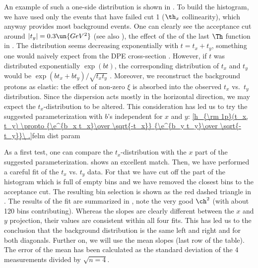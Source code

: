 \bmfig
{}
\emfig

An example of such a one-side distribution is shown in . To build the histogram, we have used only the events that have failed cut 1 ($\th_x$ collinearity), which anyway provides most background events. One can clearly see the acceptance cut around $|t_y| = 0.3\un{GeV^2}$ (see also ), the effect of the of the last $\Th$ function in . The distribution seems decreasing exponentially with $t = t_x + t_y$, something one would naively expect from the DPE cross-section . However, if $t$ was distributed exponentially $\exp(b t)$, the corresponding distribution of $t_x$ and $t_y$ would be $\exp(b t_x + b t_y)/\sqrt{t_x t_y}$
. Moreover, we reconstruct the background protons as elastic: the effect of non-zero $\xi$ is absorbed into the observed $t_x$ vs.~$t_y$ distribution. Since the dispersion acts mostly in the horizontal direction, we may expect the $t_x$-distribution to be altered. This consideration has led us to try the suggested parameterization with $b$'s independent for $x$ and $y$:
\eqref{h_{\rm 1p}(t_x, t_y) \propto {\e^{b_x t_x}\over \sqrt{-t_x}} {\e^{b_y t_y}\over \sqrt{-t_y}}\ .}{felm dist param}

As a first test, one can compare the $t_x$-distribution with the $x$ part of the suggested parameterization.  shows an excellent match. Then, we have performed a careful fit of the $t_x$ vs. $t_y$ data. For that we have cut off the part of the histogram which is full of empty bins and we have removed the closest bins to the acceptance cut. The resulting bin selection is shown as the red dashed triangle in . The results of the fit are summarized in , note the very good $\ch^2$ (with about 120 bins contributing). Whereas the slopes are clearly different between the $x$ and $y$ projection, their values are consistent within all four fits. This has led us to the conclusion that the background distribution is the same left and right and for both diagonals. Further on, we will use the mean slopes (last row of the table). The error of the mean has been calculated as the standard deviation of the 4 measurements divided by $\sqrt{n = 4}$.

